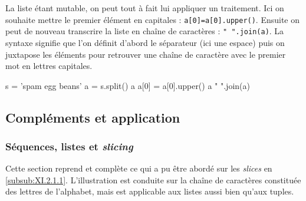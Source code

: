 La liste étant mutable, on peut tout à fait lui appliquer un traitement. Ici on souhaite mettre le premier élément en capitales : \texttt{a[0]=a[0].upper()}. Ensuite on peut de nouveau transcrire la liste en chaîne de caractères : \texttt{" ".join(a)}. La syntaxe signifie que l'on définit d'abord le séparateur (ici une espace) puis on juxtapose les éléments pour retrouver une chaîne de caractère avec le premier mot en lettres capitales.

\begin{idleconsole}
\begin{pyconsole}
s = 'spam egg beans'
a = s.split()
a
a[0] = a[0].upper()
a
" ".join(a)
\end{pyconsole}
\end{idleconsole}


\subsection[Compléments et application]{Compléments et application}
\label{sub:XI.2.2}


\subsubsection[Séquences, listes et \textit{slicing}]{Séquences, listes et \textit{slicing}}
\label{subsub:XI.2.2.1}

Cette section reprend et complète ce qui a pu être abordé sur les \textit{slices} en \cref{subsub:XI.2.1.1}. L'illustration est conduite sur la chaîne de caractères constituée des lettres de l'alphabet, mais est applicable aux listes aussi bien qu'aux tuples.

